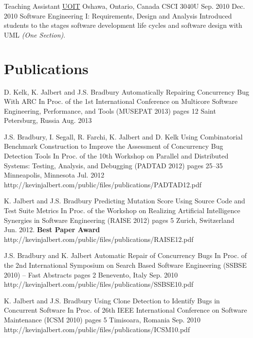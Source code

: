   \teachingEntry
    {Teaching Assistant}
    {\href{http://www.uoit.ca/}{UOIT}}
    {Oshawa, Ontario, Canada}
    {CSCI 3040U}
    {Sep. 2010}
    {Dec. 2010}
    {Software Engineering I: Requirements, Design and Analysis}
    {Introduced students to the stages software development life cycles and software design with UML \textit{(One Section)}.}

  \section{Publications}

  \publicationEntry
    {D. Kelk, K. Jalbert and J.S. Bradbury}
    {Automatically Repairing Concurrency Bug With ARC}
    {In Proc. of the 1st International Conference on Multicore Software Engineering, Performance, and Tools (MUSEPAT 2013)}
    {pages 12}
    {Saint Petersburg, Russia}
    {Aug. 2013}
    {}

  \publicationEntry
    {J.S. Bradbury, I. Segall, R. Farchi, K. Jalbert and D. Kelk}
    {Using Combinatorial Benchmark Construction to Improve the Assessment of Concurrency Bug Detection Tools}
    {In Proc. of the 10th Workshop on Parallel and Distributed Systems: Testing, Analysis, and Debugging (PADTAD 2012)}
    {pages 25--35}
    {Minneapolis, Minnesota}
    {Jul. 2012}
    {http://kevinjalbert.com/public/files/publications/PADTAD12.pdf}

  \publicationEntry
    {K. Jalbert and J.S. Bradbury}
    {Predicting Mutation Score Using Source Code and Test Suite Metrics}
    {In Proc. of the Workshop on Realizing Artificial Intelligence Synergies in Software Engineering (RAISE 2012)}
    {pages 5}
    {Zurich, Switzerland}
    {Jun. 2012. \textbf{Best Paper Award}}
    {http://kevinjalbert.com/public/files/publications/RAISE12.pdf}

  \publicationEntry
    {J.S. Bradbury and K. Jalbert}
    {Automatic Repair of Concurrency Bugs}
    {In Proc. of the 2nd International Symposium on Search Based Software Engineering (SSBSE 2010) -- Fast Abstracts}
    {pages 2}
    {Benevento, Italy}
    {Sep. 2010}
    {http://kevinjalbert.com/public/files/publications/SSBSE10.pdf}

  \publicationEntry
    {K. Jalbert and J.S. Bradbury}
    {Using Clone Detection to Identify Bugs in Concurrent Software}
    {In Proc. of 26th IEEE International Conference on Software Maintenance (ICSM 2010)}
    {pages 5}
    {Timisoara, Romania}
    {Sep. 2010}
    {http://kevinjalbert.com/public/files/publications/ICSM10.pdf}

